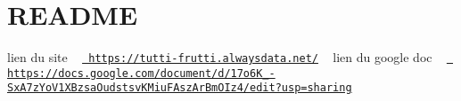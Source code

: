 \chapter{README}
\hypertarget{md__r_e_a_d_m_e}{}\label{md__r_e_a_d_m_e}
lien du site ~\newline
 \href{https://tutti-frutti.alwaysdata.net/}{\texttt{ https\+://tutti-\/frutti.\+alwaysdata.\+net/}} ~\newline
 lien du google doc ~\newline
 \href{https://docs.google.com/document/d/17o6K_-SxA7zYoV1XBzsaOudstsvKMiuFAszArBmOIz4/edit?usp=sharing}{\texttt{ https\+://docs.\+google.\+com/document/d/17o6\+K\+\_\+-\/\+Sx\+A7z\+Yo\+V1\+XBzsa\+Oudstsv\+KMiu\+FAsz\+Ar\+Bm\+OIz4/edit?usp=sharing}} 